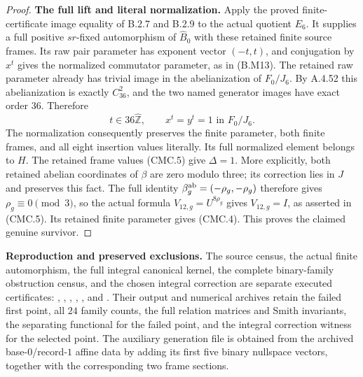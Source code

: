 \begin{proof}
\par\medskip\noindent\textbf{The full lift and literal normalization.}
Apply the proved finite-certificate image equality of B.2.7 and B.2.9
to the actual quotient $E_6$.  It supplies a full positive $sr$-fixed
automorphism of $\widehat B_0$ with these retained finite source frames.
Its raw pair parameter has exponent vector $(-t,t)$, and conjugation
by $x^t$ gives the normalized commutator parameter, as in (B.M13).
The retained raw parameter already has trivial image in the
abelianization of $F_0/J_6$.  By A.4.52 this abelianization is exactly
$C_{36}^2$, and the two named generator images have exact order $36$.
Therefore
\[
 t\in36\widehat{\mathbb Z},\qquad x^t=y^t=1\text{ in }F_0/J_6.
 \tag{CMC.17}
\]
The normalization consequently preserves the finite parameter, both
finite frames, and all eight insertion values literally.  Its full
normalized element belongs to $H$.  The retained frame values (CMC.5)
give $\Delta=1$.  More explicitly, both retained abelian coordinates of
$\beta$ are zero modulo three; its correction lies in $J$ and preserves
this fact.  The full identity $\beta_g^{\rm ab}=(-\rho_g,-\rho_g)$
therefore gives $\rho_g\equiv0\pmod3$, so the actual formula
$V_{12,g}=U^{8\rho_g}$ gives $V_{12,g}=I$, as asserted in (CMC.5).
Its retained finite parameter gives (CMC.4).
This proves the claimed genuine survivor.
\end{proof}

\par\medskip\noindent\textbf{Reproduction and preserved exclusions.}
The source census, the actual finite automorphism, the full integral
canonical kernel, the complete binary-family obstruction census, and
the chosen integral correction are separate executed certificates:
,
,
,
,
, and
.
Their output and numerical archives retain the failed first point,
all $24$ family counts, the full relation matrices and Smith invariants,
the separating functional for the failed point, and the integral
correction witness for the selected point.  The auxiliary generation
file  is obtained from the
archived base-$0$/record-$1$ affine data by adding its first five binary
nullspace vectors, together with the corresponding two frame sections.
